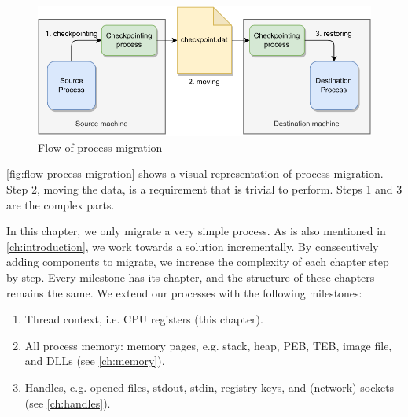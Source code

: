 \documentclass[a4paper, 11pt, english]{report}
\begin{document}
\begin{figure}[h]
\centerline{\includegraphics{images/process migration method.drawio-1.drawio-1.pdf}}
\caption{Flow of process migration}
\label{fig:flow-process-migration}
\end{figure}

\autoref{fig:flow-process-migration} shows a visual representation of process migration.
Step 2, moving the data, is a requirement that is trivial to perform. Steps 1 and 3 are the complex parts.

In this chapter, we only migrate a very simple process. As is also mentioned in \autoref{ch:introduction}, we work towards a solution incrementally. By consecutively adding components to migrate, we increase the complexity of each chapter step by step.
Every milestone has its chapter, and the structure of these chapters remains the same. We extend our processes with the following milestones:

\begin{enumerate}
	\item Thread context, i.e. CPU registers (this chapter).
	\item All process memory: memory pages, e.g. stack, heap, PEB, TEB, image file, and DLLs (see \autoref{ch:memory}).
	\item Handles, e.g. opened files, stdout, stdin, registry keys, and (network) sockets (see \autoref{ch:handles}).
\end{enumerate}
\end{document}
